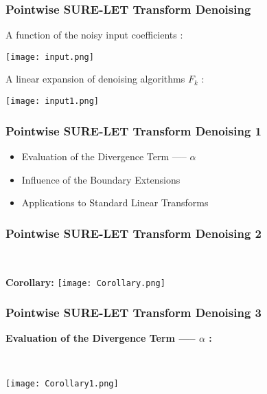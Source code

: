 \documentclass{beamer}
\begin{document}
	
	
	
	
	\begin{frame}
		\frametitle{ Pointwise SURE-LET Transform Denoising}
		A function of the noisy
		input coefficients :
		\begin{center}
			\texttt{[image: input.png]}
		\end{center}
		
		A linear
		expansion of denoising algorithms $F_k$ :
		\begin{center}
			\texttt{[image: input1.png]}
		\end{center}
		
	\end{frame}
	
	
	
	\begin{frame}
		\frametitle{Pointwise SURE-LET Transform Denoising 1}
\begin{itemize}
	\item Evaluation of the Divergence Term ----- $\alpha$ 
	\item Influence of the Boundary Extensions
	\item Applications to Standard Linear Transforms
\end{itemize}

\end{frame}
	
	
	\begin{frame}
		\frametitle{Pointwise SURE-LET Transform Denoising 2}

	
	\
	\begin{block}{\textbf{Corollary:}}
			\texttt{[image: Corollary.png]}
	\end{block}
	
	

	
	\end{frame}
	
	
	\begin{frame}
\frametitle{Pointwise SURE-LET Transform Denoising 3}
	\textbf{Evaluation of the Divergence Term ----- $\alpha$ :}
	
	\
	
	
	\texttt{[image: Corollary1.png]}
	
	\end{frame}
	
\end{document}
